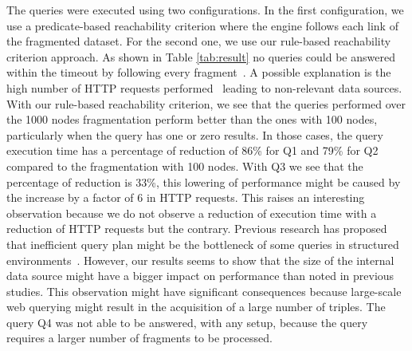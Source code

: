 The queries were executed using two configurations.
In the first configuration, we use a predicate-based reachability criterion where the engine follows each link of the fragmented dataset.
For the second one, we use our rule-based reachability criterion approach.
As shown in Table \ref{tab:result} no queries could be answered within the timeout by following every fragment~.
A possible explanation is the high number of HTTP requests performed~\cite{Hartig2016} leading to non-relevant data sources. 
With our rule-based reachability criterion, we see that the queries performed over the 1000 nodes fragmentation perform better than the ones with 100 nodes, particularly when the query has one or zero results.
In those cases, the query execution time has a percentage of reduction of 86\% for Q1 and 79\% for Q2 compared to the fragmentation with 100 nodes.
With Q3 we see that the percentage of reduction is 33\%, this lowering of performance might be caused by the increase by a factor of 6 in HTTP requests.
This raises an interesting observation because we do not observe a reduction of execution time with a reduction of HTTP requests but the contrary.
Previous research has proposed that inefficient query plan might be the bottleneck of some queries in structured environments~\cite{taelman2023,eschauzier_quweda_2023}.
However, our results seems to show that the size of the internal data source might have a bigger impact on performance than noted in previous studies.
This observation might have significant consequences because large-scale web querying might result in the acquisition of a large number of triples.
The query Q4 was not able to be answered, with any setup, because the query requires a larger number of fragments to be processed.